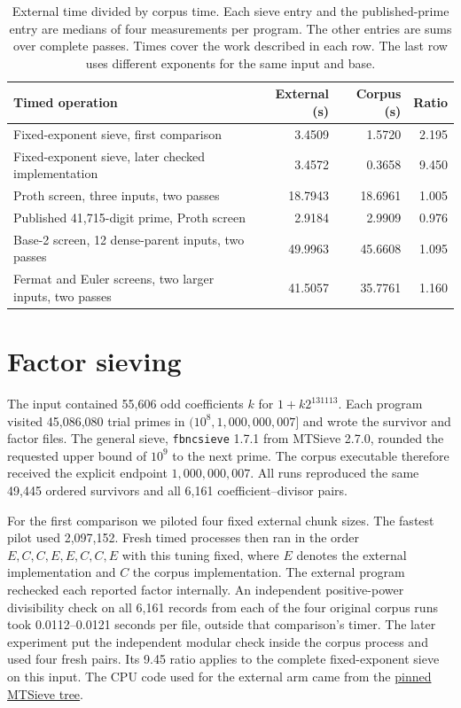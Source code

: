 \documentclass[11pt,a4paper,oneside,openany]{report}
\begin{document}
\begin{table}[htbp]
\centering\small
\begin{tabular}{@{}lrrr@{}}
\toprule
Timed operation & External (s) & Corpus (s) & Ratio\\
\midrule
Fixed-exponent sieve, first comparison & 3.4509 & 1.5720 & 2.195\\
Fixed-exponent sieve, later checked implementation & 3.4572 & 0.3658 & 9.450\\
Proth screen, three inputs, two passes &18.7943&18.6961&1.005\\
Published 41,715-digit prime, Proth screen &2.9184&2.9909&0.976\\
Base-2 screen, 12 dense-parent inputs, two passes &49.9963&45.6608&1.095\\
Fermat and Euler screens, two larger inputs, two passes &41.5057&35.7761&1.160\\
\bottomrule
\end{tabular}
\caption{External time divided by corpus time. Each sieve entry and the published-prime entry are medians of four measurements per program. The other entries are sums over complete passes. Times cover the work described in each row. The last row uses different exponents for the same input and base.}\label{tab:external-matched}
\end{table}

\section{Factor sieving}
The input contained 55,606 odd coefficients $k$ for $1+k2^{131113}$. Each program visited 45,086,080 trial primes in $(10^8,1{,}000{,}000{,}007]$ and wrote the survivor and factor files. The general sieve, \texttt{fbncsieve} 1.7.1 from MTSieve 2.7.0, rounded the requested upper bound of $10^9$ to the next prime. The corpus executable therefore received the explicit endpoint $1{,}000{,}000{,}007$. All runs reproduced the same 49,445 ordered survivors and all 6,161 coefficient--divisor pairs.

For the first comparison we piloted four fixed external chunk sizes. The fastest pilot used 2,097,152. Fresh timed processes then ran in the order $E,C,C,E,E,C,C,E$ with this tuning fixed, where $E$ denotes the external implementation and $C$ the corpus implementation. The external program rechecked each reported factor internally. An independent positive-power divisibility check on all 6,161 records from each of the four original corpus runs took 0.0112--0.0121 seconds per file, outside that comparison's timer. The later experiment put the independent modular check inside the corpus process and used four fresh pairs. Its 9.45 ratio applies to the complete fixed-exponent sieve on this input. The CPU code used for the external arm came from the \href{https://github.com/primesearch/mtsieve/tree/bd03dcd9693362853dcc31482e75aaa8e2b703c5}{pinned MTSieve tree}.
\end{document}
